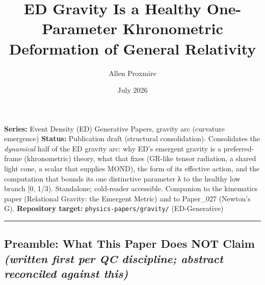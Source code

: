 \documentclass[
]{article}
\title{ED Gravity Is a Healthy One-Parameter Khronometric Deformation of General Relativity}
\author{Allen Proxmire}
\date{July 2026}
\begin{document}
\maketitle

\textbf{Series:} Event Density (ED) Generative Papers, gravity arc
(curvature emergence) \textbf{Status:} Publication draft (structural
consolidation). Consolidates the \emph{dynamical} half of the ED gravity
arc: why ED's emergent gravity is a preferred-frame (khronometric)
theory, what that fixes (GR-like tensor radiation, a shared light cone,
a scalar that supplies MOND), the form of its effective action, and the
computation that bounds its one distinctive parameter λ to the healthy
low branch {[}0, 1/3). Standalone; cold-reader accessible. Companion to
the kinematics paper (Relational Gravity: the Emergent Metric) and to
Paper\_027 (Newton's G). \textbf{Repository target:}
\texttt{physics-papers/gravity/} (ED-Generative)

\begin{center}\rule{0.5\linewidth}{0.5pt}\end{center}

\subsection{\texorpdfstring{Preamble: What This Paper Does NOT Claim
\emph{(written first per QC discipline; abstract reconciled against
this)}}{Preamble: What This Paper Does NOT Claim (written first per QC discipline; abstract reconciled against this)}}\label{preamble-what-this-paper-does-not-claim-written-first-per-qc-discipline-abstract-reconciled-against-this}
\end{document}
